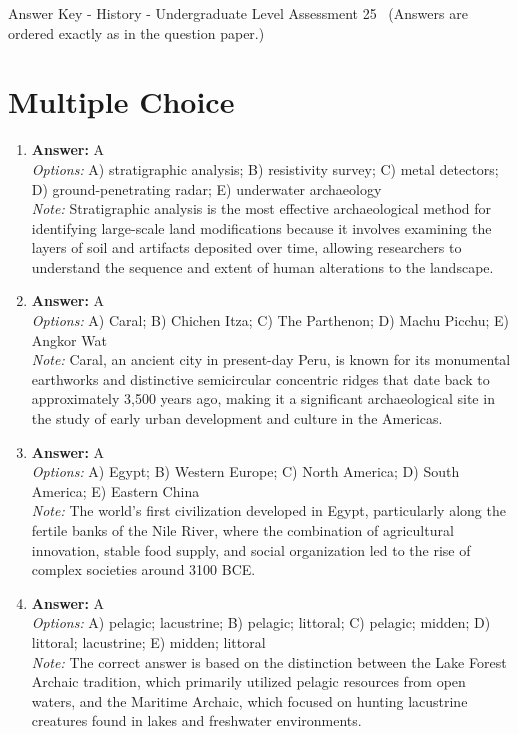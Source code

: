\documentclass[12pt]{article}
\begin{document}
\begin{center}
Answer Key - History - Undergraduate Level Assessment 25 \
\small (Answers are ordered exactly as in the question paper.)
\end{center}

\section*{Multiple Choice}
\begin{enumerate}[label=\arabic*.]
\item \textbf{Answer:} A
\\ \textit{Options:} A) stratigraphic analysis; B) resistivity survey; C) metal detectors; D) ground-penetrating radar; E) underwater archaeology
\\ \textit{Note:} Stratigraphic analysis is the most effective archaeological method for identifying large-scale land modifications because it involves examining the layers of soil and artifacts deposited over time, allowing researchers to understand the sequence and extent of human alterations to the landscape.
\item \textbf{Answer:} A
\\ \textit{Options:} A) Caral; B) Chichen Itza; C) The Parthenon; D) Machu Picchu; E) Angkor Wat
\\ \textit{Note:} Caral, an ancient city in present-day Peru, is known for its monumental earthworks and distinctive semicircular concentric ridges that date back to approximately 3,500 years ago, making it a significant archaeological site in the study of early urban development and culture in the Americas.
\item \textbf{Answer:} A
\\ \textit{Options:} A) Egypt; B) Western Europe; C) North America; D) South America; E) Eastern China
\\ \textit{Note:} The world's first civilization developed in Egypt, particularly along the fertile banks of the Nile River, where the combination of agricultural innovation, stable food supply, and social organization led to the rise of complex societies around 3100 BCE.
\item \textbf{Answer:} A
\\ \textit{Options:} A) pelagic; lacustrine; B) pelagic; littoral; C) pelagic; midden; D) littoral; lacustrine; E) midden; littoral
\\ \textit{Note:} The correct answer is based on the distinction between the Lake Forest Archaic tradition, which primarily utilized pelagic resources from open waters, and the Maritime Archaic, which focused on hunting lacustrine creatures found in lakes and freshwater environments.

\end{enumerate}
\end{document}
